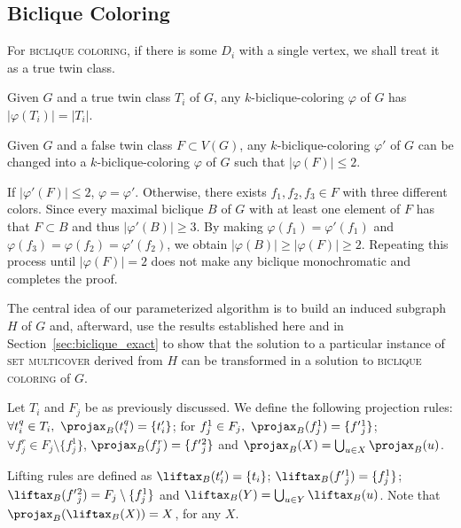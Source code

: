 \subsection{Biclique Coloring}

For \textsc{biclique coloring}, if there is some $D_i$ with a single vertex, we shall treat it as a true twin class.

\begin{observation}
    \label{obs:biclique_true_twins}
    Given $G$ and a true twin class $T_i$ of $G$, any $k$-biclique-coloring $\varphi$ of $G$ has $|\varphi(T_i)| = |T_i|$.
\end{observation}

\begin{lemma}
    \label{lem:biclique_false_twins}
    Given $G$ and a false twin class $F \subset V(G)$, any  $k$-biclique-coloring $\varphi'$ of $G$ can be changed into a $k$-biclique-coloring $\varphi$ of $G$ such that $|\varphi(F)| \leq 2$.
\end{lemma}

\begin{tproof}
    If $|\varphi'(F)| \leq 2$, $\varphi = \varphi'$.
    Otherwise, there exists $f_1, f_2, f_3 \in F$ with three different colors. 
    Since every maximal biclique $B$ of $G$ with at least one element of $F$ has that $F \subset B$ and thus $|\varphi'(B)| \geq 3$.
    By making $\varphi(f_1) = \varphi'(f_1)$ and $\varphi(f_3) = \varphi(f_2) = \varphi'(f_2)$, we obtain $|\varphi(B)| \geq |\varphi(F)| \geq 2$.
    Repeating this process until $|\varphi(F)| = 2$ does not make any biclique monochromatic and completes the proof.
\end{tproof}

The central idea of our parameterized algorithm is to build an induced subgraph $H$ of $G$ and, afterward, use the results established here and in Section~\ref{sec:biclique_exact} to show that the solution to a particular instance of \textsc{set multicover} derived from $H$ can be transformed in a solution to \textsc{biclique coloring} of $G$.


\begin{definition}
    Let $T_i$ and $F_j$ be as previously discussed.
    We define the following projection rules:
    $\forall t_i^q \in T_i,\ \Proj{B}(t_i^q) = \{t'_i\}$;
    for $f_j^1\in F_j,\ \Proj{B}(f_j^1) = \{f'{_j^1}\}$;
    $\forall f_j^r \in F_j \setminus \{f_j^1\}$, $\Proj{B}(f_j^r) = \{f'{_j^2}\}$
    and $\Proj{B}(X) = \bigcup_{u \in X} \Proj{B}(u)$.
    
    Lifting rules are defined as $\Lift{B}(t'_i) = \{t_i\}$; $\Lift{B}(f'{_j^1}) = \{f_j^1\}$; $\Lift{B}(f'{_j^2}) = F_j \setminus \{f_j^1\}$ and $\Lift{B}(Y) = \bigcup_{u \in Y} \Lift{B}(u)$. Note that $\Proj{B}(\Lift{B}(X)) = X$, for any $X$.
\end{definition}


